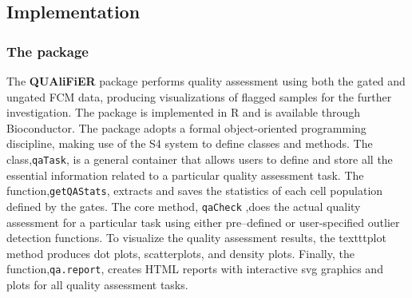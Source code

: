 \documentclass[10pt]{bmc_article}
\newenvironment{bmcformat}{\baselineskip20pt\sloppy\setboolean{publ}{false}}{\baselineskip20pt\sloppy}
\begin{document}
\begin{bmcformat}


\subsection{Implementation} 

\subsubsection*{The package}
The \textbf{QUAliFiER} package performs quality assessment using both the gated
and ungated FCM data, producing visualizations of flagged samples for the further investigation. 
The package is implemented in R and is available through Bioconductor.
\pb
The package adopts a formal object-oriented programming discipline, making use
of the S4 system \cite{Chambers2004} to define classes and methods. The
class,\texttt{qaTask}, is a general container that allows users to define and
store all the essential information related to a particular quality assessment task. 
The function,\texttt{getQAStats}, extracts and saves the statistics of each
cell population defined by the gates. The core method, \texttt{qaCheck} ,does
the actual quality assessment for a particular task using either pre--defined or user-specified outlier detection
functions. To visualize the quality assessment results, the texttt{plot} method produces dot
plots, scatterplots, and density plots. Finally, the function,\texttt{qa.report},
creates HTML reports with interactive svg graphics and plots for all quality assessment tasks.


\end{bmcformat}
\end{document}

